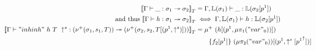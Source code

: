 \begin{align*}
  {{\llbracket {\ensuremath{ {\Gamma} \vdash {\_} : {\sigma_1} \twoheadrightarrow {\sigma_2}}} \rrbracket}_T} &=  {\Gamma, \mathbb{L}({\sigma_1})} \vdash {\_} : {\mathbb{L}({\sigma_2[p^1]})}  \\ \text{ and thus } {{\llbracket {\ensuremath{ {\Gamma} \vdash {h} : {\sigma_1} \twoheadrightarrow {\sigma_2}}} \rrbracket}_T} &\iff   {\Gamma, \ensuremath{\mathbb{L}({\sigma_1})}} \vdash {h} : {\mathbb{L}({\sigma_2[p^1]})}  \\
  {{\llbracket {\ensuremath{ {\Gamma} \vdash {"inhinh"~h~T~\uparrow^s} : {(\nu^+({\sigma_1},{s_1},{T}))} \twoheadrightarrow {(\ensuremath{\nu^+({\sigma_2},{s_2},{T[(p^1, \uparrow^s)]})})}}} \rrbracket}_T} &= \mu^+~(h[(p^1,\mu\pi_{\texttt{1}}({"var"_0}))])\\ &\quad \quad \{f_2[p^1]\}~(\mu\pi_{\texttt{2}}({"var"_0}))[(p^1, \uparrow^s[{p^1}^{\uparrow}])] \\
\end{align*}



